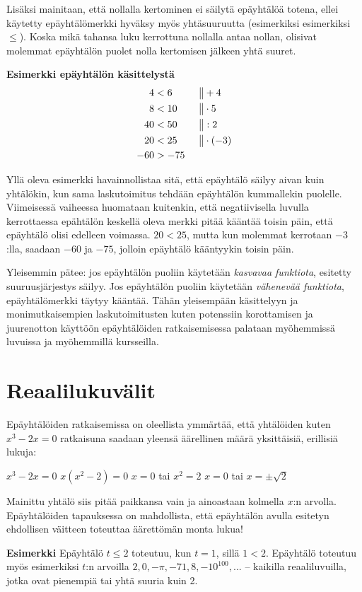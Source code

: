 Lisäksi mainitaan, että nollalla kertominen ei säilytä epäyhtälöä totena, ellei käytetty epäyhtälömerkki hyväksy myös yhtäsuuruutta (esimerkiksi esimerkiksi $\leq$). Koska mikä tahansa luku kerrottuna nollalla antaa nollan, olisivat molemmat epäyhtälön puolet nolla kertomisen jälkeen yhtä suuret.

\textbf{Esimerkki epäyhtälön käsittelystä}
\begin{align*}
4&<6  \ \ \ \ \ &&\big\| +4 \\
8&<10 &&\big\| \cdot 5 \\
40&<50 &&\big\| :2 \\
20&<25 &&\big\| \cdot (-3) \\
-60&>-75
\end{align*}

Yllä oleva esimerkki havainnollistaa sitä, että epäyhtälö säilyy aivan kuin
yhtälökin, kun sama laskutoimitus tehdään epäyhtälön kummallekin puolelle.
Viimeisessä vaiheessa huomataan kuitenkin, että negatiivisella luvulla
kerrottaessa epähtälön keskellä oleva merkki pitää kääntää toisin päin, että
epäyhtälö olisi edelleen voimassa. $20<25$, mutta kun molemmat kerrotaan
$-3$:lla, saadaan $-60$ ja $-75$, jolloin epäyhtälö kääntyykin toisin päin.

Yleisemmin pätee: jos epäyhtälön puoliin käytetään \emph{kasvavaa funktiota}, esitetty suuruusjärjestys säilyy. Jos epäyhtälön puoliin käytetään \emph{vähenevää funktiota}, epäyhtälömerkki täytyy kääntää. Tähän yleisempään käsittelyyn ja monimutkaisempien laskutoimitusten kuten potenssiin korottamisen ja juurenotton käyttöön epäyhtälöiden ratkaisemisessa palataan myöhemmissä luvuissa ja myöhemmillä kursseilla.

\section{Reaalilukuvälit}

Epäyhtälöiden ratkaisemissa on oleellista ymmärtää, että yhtälöiden kuten $x^3-2x=0$ ratkaisuna saadaan yleensä äärellinen määrä yksittäisiä, erillisiä lukuja:

$x^3-2x=0$
$x(x^2-2)=0$
$x=0$ tai $x^2=2$
$x=0$ tai $x=\pm \sqrt{2}$

Mainittu yhtälö siis pitää paikkansa vain ja ainoastaan kolmella $x$:n arvolla. Epäyhtälöiden tapauksessa on mahdollista, että epäyhtälön avulla esitetyn ehdollisen väitteen toteuttaa äärettömän monta lukua!

\textbf{Esimerkki}
Epäyhtälö $t \leq 2$ toteutuu, kun $t=1$, sillä $1<2$. Epäyhtälö toteutuu myös esimerkiksi $t$:n arvoilla $2, 0, -\pi, -71,8, -10^{100}, ...$ – kaikilla reaaliluvuilla, jotka ovat pienempiä tai yhtä suuria kuin 2.

